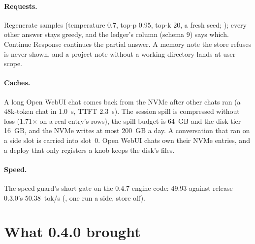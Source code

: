 \paragraph{Requests.} Regenerate samples (temperature 0.7, top-p 0.95, top-k 20, a fresh seed; ); every other answer stays greedy, and the ledger's  column (schema 9) says which. Continue Response continues the partial answer. A memory note the store refuses is never shown, and a project note without a working directory lands at user scope.

\paragraph{Caches.} A long Open WebUI chat comes back from the NVMe after other chats ran (a 48k-token chat in 1.0~s, TTFT 2.3~s). The session spill is compressed without loss (1.71$\times$ on a real entry's rows), the spill budget is 64~GB and the disk tier 16~GB, and the NVMe writes at most 200~GB a day. A conversation that ran on a side slot is carried into slot~0. Open WebUI chats own their NVMe entries, and a deploy that only registers a knob keeps the disk's files.

\paragraph{Speed.} The speed guard's short gate on the 0.4.7 engine code: 49.93 against release 0.3.0's 50.38~tok/s (\measured, one run a side, store off).

\section{What 0.4.0 brought}

